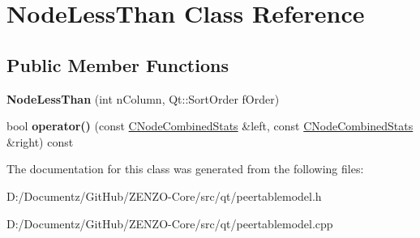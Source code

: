 \hypertarget{class_node_less_than}{}\section{Node\+Less\+Than Class Reference}
\label{class_node_less_than}
\subsection*{Public Member Functions}
\begin{DoxyCompactItemize}
\item 
\mbox{\label{class_node_less_than_ab9d2ef05545cba5acb3b3bc2ea9c859c}} 
{\bfseries Node\+Less\+Than} (int n\+Column, Qt\+::\+Sort\+Order f\+Order)
\item 
\mbox{\label{class_node_less_than_a001e114bc5defaaec4feb1be3c71a327}} 
bool {\bfseries operator()} (const \mbox{\hyperlink{struct_c_node_combined_stats}{C\+Node\+Combined\+Stats}} \&left, const \mbox{\hyperlink{struct_c_node_combined_stats}{C\+Node\+Combined\+Stats}} \&right) const
\end{DoxyCompactItemize}


The documentation for this class was generated from the following files\+:\begin{DoxyCompactItemize}
\item 
D\+:/\+Documentz/\+Git\+Hub/\+Z\+E\+N\+Z\+O-\/\+Core/src/qt/peertablemodel.\+h\item 
D\+:/\+Documentz/\+Git\+Hub/\+Z\+E\+N\+Z\+O-\/\+Core/src/qt/peertablemodel.\+cpp\end{DoxyCompactItemize}
